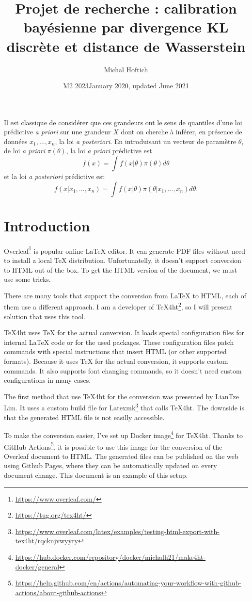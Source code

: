 \documentclass{article}
\title{Projet de recherche : calibration bay\'esienne par divergence KL discr\`ete et distance de Wasserstein}
\date{M2 2023}
\author{Michal Hoftich}
\date{January 2020, updated June 2021}
\newcommand\footurl[1]{\footnote{\url{#1}}}
\newcommand\urllink[2]{#1\footurl{#2}}
\begin{document}
\maketitle

Il est classique de consid\'erer que ces grandeurs ont le sens de quantiles d'une loi pr\'edictive {\it a priori} sur une grandeur $X$ dont on cherche \`a inf\'erer, en pr\'esence de donn\'ees $x_1,\ldots,x_n$, la loi {\it a posteriori}. En introduisant un vecteur de param\`etre $\theta$, de loi {\it a priori} $\pi(\theta)$, la loi {\it a priori} pr\'edictive est
$$
f(x)=\int f(x|\theta) \pi(\theta) d \theta
$$
et la loi {\it a posteriori} pr\'edictive est
$$
f(x|x_1,\ldots,x_n)=\int f(x|\theta) \pi(\theta|x_1,\ldots,x_n) d \theta.
$$


\section{Introduction}

\urllink{Overleaf}{https://www.overleaf.com/} is popular online \LaTeX{}
editor. It can generate PDF files 
without need to install a local \TeX{} distribution. Unfortunatelly, it doesn't
support conversion to HTML out of the box. To get the HTML version of the
document, we must use some tricks.

There are many tools that support the conversion from \LaTeX{} to HTML, each of
them use a different approach. I am a developer of
\urllink{\TeX4ht}{https://tug.org/tex4ht/}, so I will present solution that
uses this tool. 

\TeX4ht uses \TeX{} for the actual conversion. It loads special configuration
files for internal \LaTeX{} code or for the used packages. These configuration
files patch commands with special instructions that insert HTML (or other
supported formats). Because it uses \TeX{} for the actual conversion, it
supports custom commands. It also supports font changing commands, so  it
doesn't need custom configurations in many cases.

The first method that use \TeX4ht for the conversion was presented by LianTze
Lim. It uses a custom build file for
\urllink{Latexmk}{https://www.overleaf.com/latex/examples/testing-html-export-with-tex4ht/rqcknjvwyyry} 
that calls \TeX4ht. The downside is that the generated HTML file is not easilly accessible.  

To make the conversion easier, I've set up \urllink{Docker image}{https://hub.docker.com/repository/docker/michalh21/make4ht-docker/general} for \TeX4ht. 
Thanks to \urllink{GitHub Actions}{https://help.github.com/en/actions/automating-your-workflow-with-github-actions/about-github-actions}, 
it is possible to use this image for the conversion of the Overleaf document to HTML. 
The generated files can be published on the web using Github Pages, where they can be automatically 
updated on every document change. This document is an example of this setup.
\end{document}
